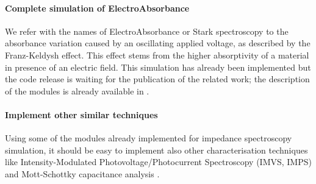 	\paragraph{Complete simulation of ElectroAbsorbance}
	We refer with the names of ElectroAbsorbance or Stark spectroscopy to the absorbance variation caused by an oscillating applied voltage, as described by the Franz\hyp{}Keldysh effect.
	This effect stems from the higher absorptivity of a material in presence of an electric field.
	This simulation has already been implemented but the code release is waiting for the publication of the related work; the description of the modules is already available in .

	\paragraph{Implement other similar techniques}
	Using some of the modules already implemented for impedance spectroscopy simulation, it should be easy to implement also other characterisation techniques like Intensity-Modulated Photovoltage/Photocurrent Spectroscopy (IMVS, IMPS) \cite{Pockett2015,Guillen2014} and Mott-Schottky capacitance analysis \cite{Almora2016}.

